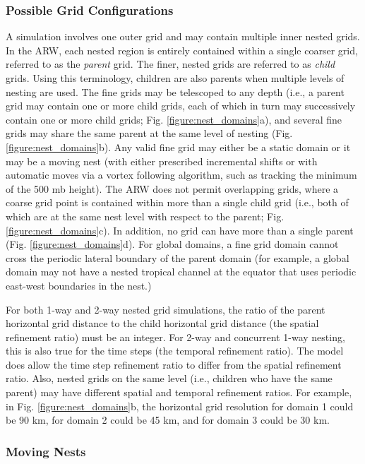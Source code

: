 \subsubsection{Possible Grid Configurations}

A simulation involves one outer grid and may contain multiple
inner nested grids.  In the ARW, each nested region is entirely
contained within 
a single coarser grid, referred to as the {\em parent}
grid.  The finer, nested grids are referred to as {\em child} grids.
Using this terminology, children are also parents when multiple levels
of nesting are used.  The fine grids may be telescoped to any depth (i.e., 
a
parent grid may contain one or more child grids, each of which in turn
may successively contain one or more child grids; Fig.
\ref{figure:nest_domains}a), and several fine grids may share the
same parent at the same level of nesting (Fig.
\ref{figure:nest_domains}b).  
Any valid fine grid may either be a static domain or it may be a moving nest
(with either prescribed incremental shifts or with automatic moves
via a vortex following algorithm, such as tracking the minimum of the 500 mb height).  
The ARW does not permit overlapping
grids, where a coarse grid point is contained within more than a
single child grid (i.e., both of which are at the same nest level with respect
to the parent; Fig. \ref{figure:nest_domains}c).  In addition, no grid can have
more than a single parent (Fig. \ref{figure:nest_domains}d).  For global domains, a
fine grid domain cannot cross the periodic lateral boundary of the parent domain
(for example, a global domain may not have a nested tropical channel at the 
equator that uses periodic east-west boundaries in the nest.)

For both 1-way and 2-way nested grid simulations, the ratio of the
parent horizontal grid distance to the child horizontal grid distance
(the spatial refinement ratio) must be an integer.  For 2-way and concurrent 1-way
nesting, this is also true for
the time steps (the temporal refinement ratio).  The model does allow
the time step refinement ratio to differ from the spatial refinement
ratio.  Also, nested grids on the same level (i.e., children who have the
same parent) may have different spatial and temporal refinement ratios.  For example,
in Fig. \ref{figure:nest_domains}b, the horizontal grid resolution for 
domain 1 could be 90 km, for
domain 2 could be 45 km, and for domain 3 could be 30 km.

\subsubsection{Moving Nests}

